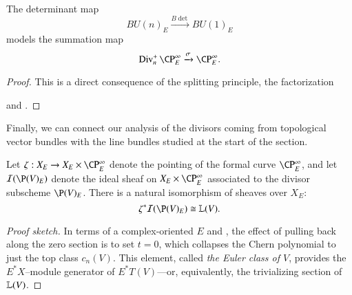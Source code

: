 \begin{corollary}\label{BdetCorollary}
The determinant map \[BU(n)_E \xrightarrow{B\det} BU(1)_E\] models the summation map \[\Div^+_n \CP^\infty_E \xrightarrow{\sigma} \CP^\infty_E.\]
\end{corollary}
\begin{proof}
This is a direct consequence of the splitting principle, the factorization
\begin{center}
\end{center}
and .
\end{proof}

Finally, we can connect our analysis of the divisors coming from topological vector bundles with the line bundles studied at the start of the section.
\begin{lemma}
Let $\zeta: X_E \to X_E \times \CP^\infty_E$ denote the pointing of the formal curve $\CP^\infty_E$, and let $\sheaf I(\P(V)_E)$ denote the ideal sheaf on $X_E \times \CP^\infty_E$ associated to the divisor subscheme $\P(V)_E$.  There is a natural isomorphism of sheaves over $X_E$: \[\zeta^* \sheaf I(\P(V)_E) \cong \ThomSheaf{V}.\]
\end{lemma}
\begin{proof}[Proof sketch]
In terms of a complex-oriented $E$ and , the effect of pulling back along the zero section is to set $t = 0$, which collapses the Chern polynomial to just the top class $c_n(V)$.  This element, called \textit{the Euler class of $V$}, provides the $E^* X$--module generator of $E^* T(V)$---or, equivalently, the trivializing section of $\mathbb{L}(V)$.
\end{proof}

